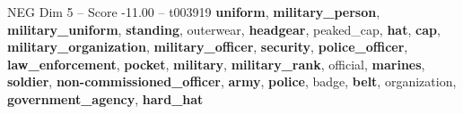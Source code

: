 \begin{textsample}{NEG Dim 5 – Score -11.00 – t003919}  \label{ex:f5_neg_003}
\textbf{uniform}, \textbf{military\_person}, \textbf{military\_uniform}, \textbf{standing}, outerwear, \textbf{headgear}, peaked\_cap, \textbf{hat}, \textbf{cap}, \textbf{military\_organization}, \textbf{military\_officer}, \textbf{security}, \textbf{police\_officer}, \textbf{law\_enforcement}, \textbf{pocket}, \textbf{military}, \textbf{military\_rank}, official, \textbf{marines}, \textbf{soldier}, \textbf{non-commissioned\_officer}, \textbf{army}, \textbf{police}, badge, \textbf{belt}, organization, \textbf{government\_agency}, \textbf{hard\_hat}

\end{textsample}
